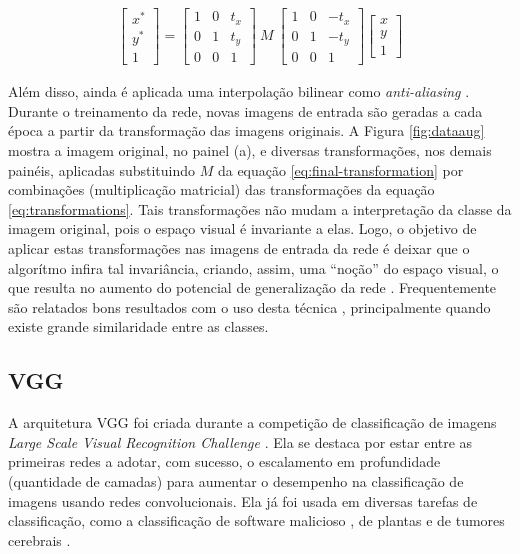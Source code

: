 \begin{align} \label{eq:final-transformation}
  \begin{bmatrix}
    x^* \\
    y^* \\
    1
  \end{bmatrix}
  =
  \begin{bmatrix}
    1 & 0 & t_x \\
    0 & 1 & t_y \\
    0 & 0 & 1
  \end{bmatrix}
  \ M\
  \begin{bmatrix}
    1 & 0 & -t_x \\
    0 & 1 & -t_y \\
    0 & 0 & 1
  \end{bmatrix}
  \begin{bmatrix}
    x \\
    y \\
    1
  \end{bmatrix}
\end{align}

Além disso, ainda é aplicada uma interpolação bilinear como \emph{anti-aliasing} \cite{aliasing, bilinear}. Durante o treinamento da rede, novas imagens de entrada são geradas a cada época a partir da transformação das imagens originais. A Figura \ref{fig:dataaug} mostra a imagem original, no painel (a), e diversas transformações, nos demais painéis, aplicadas substituindo $M$ da equação \eqref{eq:final-transformation} por combinações (multiplicação matricial) das transformações da equação \eqref{eq:transformations}. Tais transformações não mudam a interpretação da classe da imagem original, pois o espaço visual é invariante a elas. Logo, o objetivo de aplicar estas transformações nas imagens de entrada da rede é deixar que o algorítmo infira tal invariância, criando, assim, uma ``noção'' do espaço visual, o que resulta no aumento do potencial de generalização da rede \cite{Simard2003, CholletBook}. Frequentemente são relatados bons resultados com o uso desta técnica \cite{EfficientNetEx01, EfficientNetEx02, CNNEx04}, principalmente quando existe grande similaridade entre as classes.


\subsection{VGG}
\label{section:vgg}
A arquitetura VGG \cite{VGG16} foi criada durante a competição de classificação de imagens \textit{Large Scale Visual Recognition Challenge} \cite{ILSVRC15}. Ela se destaca por estar entre as primeiras redes a adotar, com sucesso, o escalamento em profundidade (quantidade de camadas) para aumentar o desempenho na classificação de imagens usando redes convolucionais. Ela já foi usada em diversas tarefas de classificação, como a classificação de software malicioso \cite{VGG16Ex01}, de plantas \cite{VGG16Ex02} e de tumores cerebrais \cite{VGG16Ex03}.

